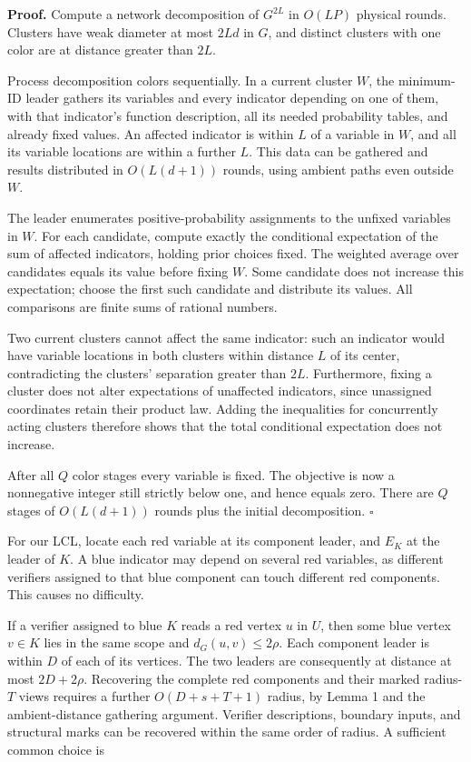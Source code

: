 \documentclass[11pt,a4paper]{article}
\begin{document}
\textbf{Proof.} Compute a network decomposition of \(G^{2L}\) in \(O(LP)\) physical rounds.
Clusters have weak diameter at most \(2Ld\) in \(G\), and distinct clusters with one color are at distance greater than \(2L\).

Process decomposition colors sequentially.
In a current cluster \(W\), the minimum-ID leader gathers its variables and every indicator depending on one of them, with that indicator's function description, all its needed probability tables, and already fixed values.
An affected indicator is within \(L\) of a variable in \(W\), and all its variable locations are within a further \(L\).
This data can be gathered and results distributed in \(O(L(d+1))\) rounds, using ambient paths even outside \(W\).

The leader enumerates positive-probability assignments to the unfixed variables in \(W\).
For each candidate, compute exactly the conditional expectation of the sum of affected indicators, holding prior choices fixed.
The weighted average over candidates equals its value before fixing \(W\).
Some candidate does not increase this expectation; choose the first such candidate and distribute its values.
All comparisons are finite sums of rational numbers.

Two current clusters cannot affect the same indicator: such an indicator would have variable locations in both clusters within distance \(L\) of its center, contradicting the clusters' separation greater than \(2L\).
Furthermore, fixing a cluster does not alter expectations of unaffected indicators, since unassigned coordinates retain their product law.
Adding the inequalities for concurrently acting clusters therefore shows that the total conditional expectation does not increase.

After all \(Q\) color stages every variable is fixed.
The objective is now a nonnegative integer still strictly below one, and hence equals zero.
There are \(Q\) stages of \(O(L(d+1))\) rounds plus the initial decomposition. \(\square\)

For our LCL, locate each red variable at its component leader, and \(E_K\) at the leader of \(K\).
A blue indicator may depend on several red variables, as different verifiers assigned to that blue component can touch different red components.
This causes no difficulty.

If a verifier assigned to blue \(K\) reads a red vertex \(u\) in \(U\), then some blue vertex \(v\in K\) lies in the same scope and \(d_G(u,v)\le2\rho\).
Each component leader is within \(D\) of each of its vertices.
The two leaders are consequently at distance at most \(2D+2\rho\).
Recovering the complete red components and their marked radius-\(T\) views requires a further \(O(D+s+T+1)\) radius, by Lemma 1 and the ambient-distance gathering argument.
Verifier descriptions, boundary inputs, and structural marks can be recovered within the same order of radius.
A sufficient common choice is
\end{document}
